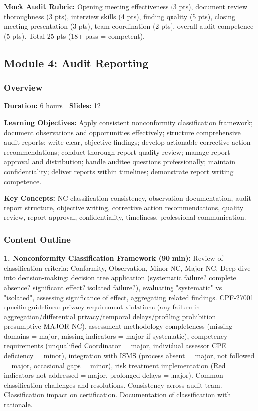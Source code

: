\documentclass[11pt,a4paper]{article}
\begin{document}
\textbf{Mock Audit Rubric:} Opening meeting effectiveness (3 pts), document review thoroughness (3 pts), interview skills (4 pts), finding quality (5 pts), closing meeting presentation (3 pts), team coordination (2 pts), overall audit competence (5 pts). Total 25 pts (18+ pass = competent).

\subsection{Module 4: Audit Reporting}

\subsubsection{Overview}
\textbf{Duration:} 6 hours | \textbf{Slides:} 12

\textbf{Learning Objectives:} Apply consistent nonconformity classification framework; document observations and opportunities effectively; structure comprehensive audit reports; write clear, objective findings; develop actionable corrective action recommendations; conduct thorough report quality review; manage report approval and distribution; handle auditee questions professionally; maintain confidentiality; deliver reports within timelines; demonstrate report writing competence.

\textbf{Key Concepts:} NC classification consistency, observation documentation, audit report structure, objective writing, corrective action recommendations, quality review, report approval, confidentiality, timeliness, professional communication.

\subsubsection{Content Outline}

\textbf{1. Nonconformity Classification Framework (90 min):} Review of classification criteria: Conformity, Observation, Minor NC, Major NC. Deep dive into decision-making: decision tree application (systematic failure? complete absence? significant effect? isolated failure?), evaluating "systematic" vs "isolated", assessing significance of effect, aggregating related findings. CPF-27001 specific guidelines: privacy requirement violations (any failure in aggregation/differential privacy/temporal delays/profiling prohibition = presumptive MAJOR NC), assessment methodology completeness (missing domains = major, missing indicators = major if systematic), competency requirements (unqualified Coordinator = major, individual assessor CPE deficiency = minor), integration with ISMS (process absent = major, not followed = major, occasional gaps = minor), risk treatment implementation (Red indicators not addressed = major, prolonged delays = major). Common classification challenges and resolutions. Consistency across audit team. Classification impact on certification. Documentation of classification with rationale.
\end{document}

